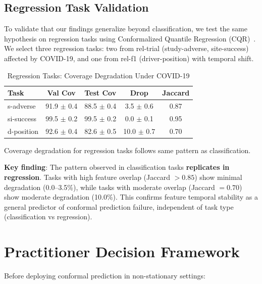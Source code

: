 \documentclass[sigconf]{acmart}
\begin{document}
\subsection{Regression Task Validation}

To validate that our findings generalize beyond classification, we test the same hypothesis on regression tasks using Conformalized Quantile Regression (CQR)~\cite{romano2019conformalized}. We select three regression tasks: two from rel-trial (study-adverse, site-success) affected by COVID-19, and one from rel-f1 (driver-position) with temporal shift.

\begin{table}[h]
\centering
\caption{Regression Tasks: Coverage Degradation Under COVID-19}
\label{tab:regression}
\begin{tabular}{lcccc}
\toprule
Task & Val Cov & Test Cov & Drop & Jaccard \\
\midrule
s-adverse & 91.9 $\pm$ 0.4 & 88.5 $\pm$ 0.4 & 3.5 $\pm$ 0.6 & 0.87 \\
si-success & 99.5 $\pm$ 0.2 & 99.5 $\pm$ 0.2 & 0.0 $\pm$ 0.1 & 0.95 \\
d-position & 92.6 $\pm$ 0.4 & 82.6 $\pm$ 0.5 & 10.0 $\pm$ 0.7 & 0.70 \\
\bottomrule
\end{tabular}
\vspace{1mm}
\small{Coverage degradation for regression tasks follows same pattern as classification.}
\end{table}

\textbf{Key finding}: The pattern observed in classification tasks \textbf{replicates in regression}. Tasks with high feature overlap (Jaccard $> 0.85$) show minimal degradation (0.0--3.5\%), while tasks with moderate overlap (Jaccard $= 0.70$) show moderate degradation (10.0\%). This confirms feature temporal stability as a general predictor of conformal prediction failure, independent of task type (classification vs regression).

\section{Practitioner Decision Framework}

Before deploying conformal prediction in non-stationary settings:
\end{document}
